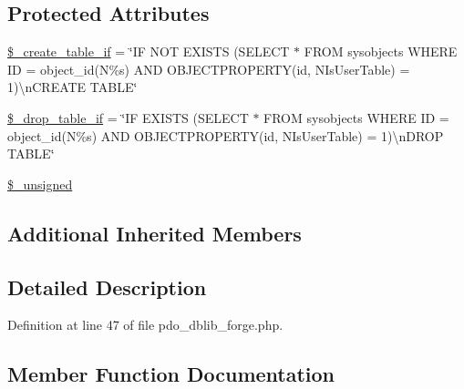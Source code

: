 \subsection*{Protected Attributes}
\begin{DoxyCompactItemize}
\item 
\mbox{\hyperlink{class_c_i___d_b__pdo__dblib__forge_a2f6484fcb8d1dc3eef67a637227cd583}{\$\+\_\+create\+\_\+table\+\_\+if}} = \char`\"{}IF N\+OT E\+X\+I\+S\+TS (S\+E\+L\+E\+CT $\ast$ F\+R\+OM sysobjects W\+H\+E\+RE ID = object\+\_\+id(N\textquotesingle{}\%s\textquotesingle{}) A\+ND O\+B\+J\+E\+C\+T\+P\+R\+O\+P\+E\+R\+TY(id, N\textquotesingle{}Is\+User\+Table\textquotesingle{}) = 1)\textbackslash{}n\+C\+R\+E\+A\+TE T\+A\+B\+LE\char`\"{}
\item 
\mbox{\hyperlink{class_c_i___d_b__pdo__dblib__forge_a92a8a9145a7fc91e252e58d019373581}{\$\+\_\+drop\+\_\+table\+\_\+if}} = \char`\"{}IF E\+X\+I\+S\+TS (S\+E\+L\+E\+CT $\ast$ F\+R\+OM sysobjects W\+H\+E\+RE ID = object\+\_\+id(N\textquotesingle{}\%s\textquotesingle{}) A\+ND O\+B\+J\+E\+C\+T\+P\+R\+O\+P\+E\+R\+TY(id, N\textquotesingle{}Is\+User\+Table\textquotesingle{}) = 1)\textbackslash{}n\+D\+R\+OP T\+A\+B\+LE\char`\"{}
\item 
\mbox{\hyperlink{class_c_i___d_b__pdo__dblib__forge_aae977ae6d61fa183f0b25422b6ddc31c}{\$\+\_\+unsigned}}
\end{DoxyCompactItemize}
\subsection*{Additional Inherited Members}


\subsection{Detailed Description}


Definition at line 47 of file pdo\+\_\+dblib\+\_\+forge.\+php.



\subsection{Member Function Documentation}
\mbox{\label{class_c_i___d_b__pdo__dblib__forge_a41c6cae02f2fda8b429ad0afb9509426}} 
